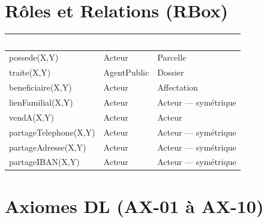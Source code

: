 \documentclass[11pt,a4paper]{report}
\begin{document}
\section{Rôles et Relations (RBox)}

\begin{center}
\begin{tabular}{>{\ttfamily}p{4.5cm} p{2.5cm} p{6cm}}
\toprule
\rowcolor{tablehead}\textcolor{white}{Rôle} & \textcolor{white}{Domaine} & \textcolor{white}{Co-domaine} \\
\midrule
possede(X,Y)          & Acteur      & Parcelle \\
traite(X,Y)           & AgentPublic & Dossier \\
beneficiaire(X,Y)     & Acteur      & Affectation \\
lienFamilial(X,Y)     & Acteur      & Acteur — symétrique \\
vendA(X,Y)            & Acteur      & Acteur \\
partageTelephone(X,Y) & Acteur      & Acteur — symétrique \\
partageAdresse(X,Y)   & Acteur      & Acteur — symétrique \\
partageIBAN(X,Y)      & Acteur      & Acteur — symétrique \\
\bottomrule
\end{tabular}
\end{center}

\section{Axiomes DL (AX-01 à AX-10)}
\end{document}
